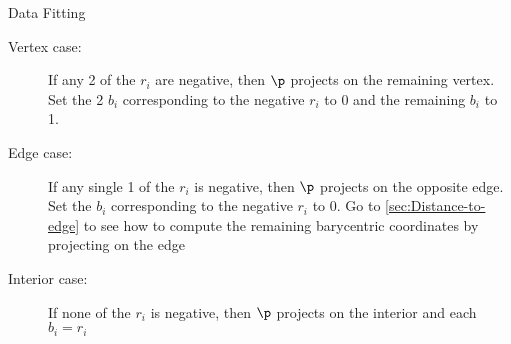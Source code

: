\begin{plSection}{Data Fitting}
\begin{description}

\item[Vertex case:]
If any 2 of the $r_i$ are negative,
then $\p$ projects on the remaining vertex.
Set the 2 $b_i$ corresponding to the negative $r_i$
to 0 and the remaining $b_i$ to 1.

\item[Edge case:]
If any single 1 of the $r_i$ is negative,
then $\p$ projects on the opposite edge.
Set the $b_i$ corresponding to the negative $r_i$
to 0.
Go to \autoref{sec:Distance-to-edge} to see
how to compute the remaining barycentric coordinates
by projecting on the edge

\item[Interior case:]
If none of the $r_i$ is negative,
then $\p$ projects on the interior
and each $b_i = r_i$

\end{description}
\end{plSection}%
